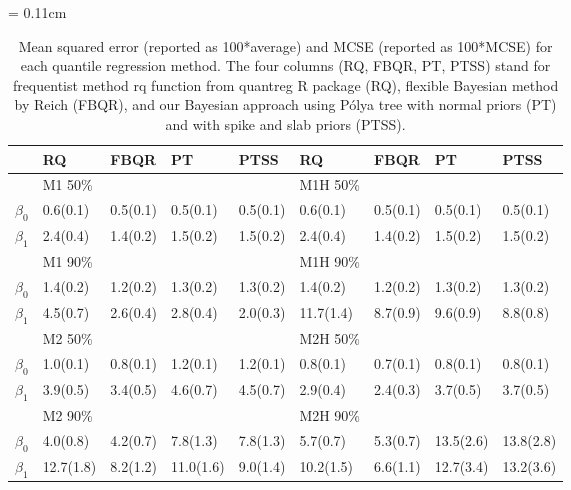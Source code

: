 \documentclass[12pt]{article}
\newcommand{\polya}{P\'{o}lya}
\begin{document}
\begin{center}
  \begin{table}[h]
    \centering
    \caption[]{ Mean squared error (reported as 100*average) and MCSE
      (reported as 100*MCSE) for each
      quantile regression method.   The four
      columns (RQ, FBQR,
      PT, PTSS) stand for frequentist method rq function from
      quantreg R package (RQ), flexible Bayesian method by Reich (FBQR), and
      our Bayesian approach using \polya{} tree with normal priors (PT) and with
      spike and slab priors (PTSS).}
    \vspace{4mm}
    \tabcolsep = 0.11cm
    \begin{tabular}[tb]{cllllllll}
  \hline
          & RQ        & FBQR      & PT        & PTSS      & RQ        & FBQR      & PT        & PTSS      \\
      \hline
          & M1 50\%   &           &           &           & M1H 50\%  &           &           &           \\
$\beta_0$ & 0.6(0.1)  & 0.5(0.1)  & 0.5(0.1)  & 0.5(0.1)  & 0.6(0.1)  & 0.5(0.1)  & 0.5(0.1)  & 0.5(0.1)  \\
$\beta_1$ & 2.4(0.4)  & 1.4(0.2)  & 1.5(0.2)  & 1.5(0.2)  & 2.4(0.4)  & 1.4(0.2)  & 1.5(0.2)  & 1.5(0.2)  \\
          & M1 90\%   &           &           &           & M1H 90\%  &           &           &           \\
$\beta_0$ & 1.4(0.2)  & 1.2(0.2)  & 1.3(0.2)  & 1.3(0.2)  & 1.4(0.2)  & 1.2(0.2)  & 1.3(0.2)  & 1.3(0.2)  \\
$\beta_1$ & 4.5(0.7)  & 2.6(0.4)  & 2.8(0.4)  & 2.0(0.3)    & 11.7(1.4) & 8.7(0.9)  & 9.6(0.9)  & 8.8(0.8)  \\
          & M2 50\%   &           &           &           & M2H 50\%  &           &           &           \\
$\beta_0$ & 1.0(0.1)  & 0.8(0.1)  & 1.2(0.1)  & 1.2(0.1)  & 0.8(0.1)  & 0.7(0.1)  & 0.8(0.1)  & 0.8(0.1)  \\
$\beta_1$ & 3.9(0.5)  & 3.4(0.5)  & 4.6(0.7)  & 4.5(0.7)  & 2.9(0.4)  & 2.4(0.3)  & 3.7(0.5)  & 3.7(0.5)  \\
          & M2 90\%   &           &           &           & M2H 90\%  &           &           &           \\
$\beta_0$ & 4.0(0.8)  & 4.2(0.7)  & 7.8(1.3)  & 7.8(1.3)  & 5.7(0.7)  & 5.3(0.7)  & 13.5(2.6) & 13.8(2.8) \\
$\beta_1$ & 12.7(1.8) & 8.2(1.2)  & 11.0(1.6) & 9.0(1.4)  & 10.2(1.5) & 6.6(1.1)  & 12.7(3.4) & 13.2(3.6) \\

\end{tabular}
\end{table}
\end{center}
\end{document}
